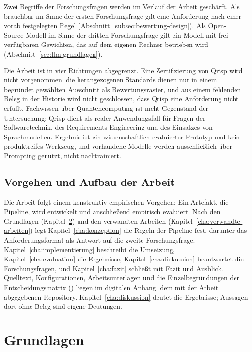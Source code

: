 \documentclass[11pt,a4paper]{report}
\begin{document}
Zwei Begriffe der Forschungsfragen werden im Verlauf der Arbeit
geschärft. Als brauchbar im Sinne der ersten Forschungsfrage gilt eine
Anforderung nach einer vorab festgelegten Regel
(Abschnitt~\ref{subsec:bewertung-design}). Als Open-Source-Modell im
Sinne der dritten Forschungsfrage gilt ein Modell mit frei verfügbaren
Gewichten, das auf dem eigenen Rechner betrieben wird
(Abschnitt~\ref{sec:llm-grundlagen}).

Die Arbeit ist in vier Richtungen abgegrenzt. Eine Zertifizierung von
Qrisp wird nicht vorgenommen, die herangezogenen Standards dienen nur
in einem begründet gewählten Ausschnitt als Bewertungsraster, und aus
einem fehlenden Beleg in der Historie wird nicht geschlossen, dass
Qrisp eine Anforderung nicht erfüllt. Fachwissen über Quantencomputing
ist nicht Gegenstand der Untersuchung; Qrisp dient als realer
Anwendungsfall für Fragen der Softwaretechnik, des Requirements
Engineering und des Einsatzes von Sprachmodellen. Ergebnis ist ein
wissenschaftlich evaluierter Prototyp und kein produktreifes Werkzeug,
und vorhandene Modelle werden ausschließlich über Prompting genutzt,
nicht nachtrainiert.

\section{Vorgehen und Aufbau der Arbeit}
\label{sec:einl-aufbau}

Die Arbeit folgt einem konstruktiv-empirischen Vorgehen: Ein Artefakt,
die Pipeline, wird entwickelt und anschließend empirisch evaluiert.
Nach den Grundlagen (Kapitel~\ref{cha:grundlagen}) und den verwandten
Arbeiten (Kapitel~\ref{cha:verwandte-arbeiten}) legt
Kapitel~\ref{cha:konzeption} die Regeln der Pipeline fest, darunter
das Anforderungsformat als Antwort auf die zweite Forschungsfrage.
Kapitel~\ref{cha:implementierung} beschreibt die Umsetzung,
Kapitel~\ref{cha:evaluation} die Ergebnisse,
Kapitel~\ref{cha:diskussion} beantwortet die Forschungsfragen, und
Kapitel~\ref{cha:fazit} schließt mit Fazit und Ausblick. Quelltext,
Konfigurationen, Arbeitsunterlagen und die Einzelbegründungen der
Entscheidungsmatrix () liegen im digitalen
Anhang, dem mit der Arbeit abgegebenen Repository. Kapitel~\ref{cha:diskussion}
deutet die Ergebnisse; Aussagen dort ohne Beleg sind eigene Deutungen.

\chapter{Grundlagen}
\label{cha:grundlagen}
\end{document}
